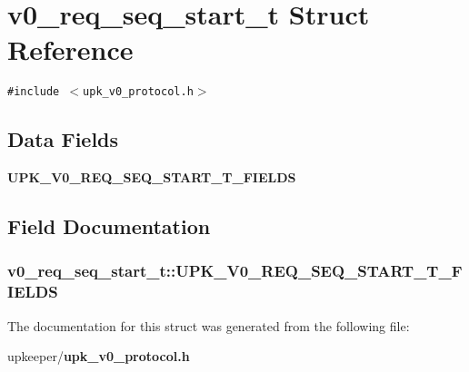 \section{v0\_\-req\_\-seq\_\-start\_\-t Struct Reference}
\label{structv0__req__seq__start__t}
{\tt \#include $<$upk\_\-v0\_\-protocol.h$>$}

\subsection*{Data Fields}
\begin{CompactItemize}
\item 
\bf{UPK\_\-V0\_\-REQ\_\-SEQ\_\-START\_\-T\_\-FIELDS}
\end{CompactItemize}


\subsection{Field Documentation}
\subsubsection{\setlength{\rightskip}{0pt plus 5cm}\bf{v0\_\-req\_\-seq\_\-start\_\-t::UPK\_\-V0\_\-REQ\_\-SEQ\_\-START\_\-T\_\-FIELDS}}\label{structv0__req__seq__start__t_95595127e56a41bb8e7ffce2ea0c258b}




The documentation for this struct was generated from the following file:\begin{CompactItemize}
\item 
upkeeper/\bf{upk\_\-v0\_\-protocol.h}\end{CompactItemize}
